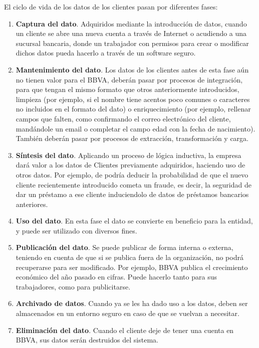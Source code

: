 \documentclass{article}
\begin{document}
El ciclo de vida de los datos de los clientes pasan por diferentes fases:

\begin{enumerate}
\item \textbf{Captura del dato}. Adquiridos mediante la introducción de datos, cuando un cliente se abre una nueva cuenta a través de Internet o acudiendo a una sucursal bancaria, donde un trabajador con permisos para crear o modificar dichos datos pueda hacerlo a través de un software seguro.
\item \textbf{Mantenimiento del dato}. Los datos de los clientes antes de esta fase aún no tienen valor para el BBVA, deberán pasar por procesos de integración, para que tengan el mismo formato que otros anteriormente introducidos, limpieza (por ejemplo, si el nombre tiene acentos poco comunes o caracteres no incluidos en el formato del dato) o enriquecimiento (por ejemplo, rellenar campos que falten, como confirmando el correo electrónico del cliente, mandándole un email o completar el campo edad con la fecha de nacimiento). También deberán pasar por procesos de extracción, transformación y carga.
\item \textbf{Síntesis del dato}. Aplicando un proceso de lógica inductiva, la empresa dará valor a los datos de Clientes previamente adquiridos, haciendo uso de otros datos. Por ejemplo, de podría deducir la probabilidad de que el nuevo cliente recientemente introducido cometa un fraude, es decir, la seguridad de dar un préstamo a ese cliente induciendolo de datos de préstamos bancarios anteriores.
\item \textbf{Uso del dato}. En esta fase el dato se convierte en beneficio para la entidad, y puede ser utilizado con diversos fines.
\item \textbf{Publicación del dato}. Se puede publicar de forma interna o externa, teniendo en cuenta de que si se publica fuera de la organización, no podrá recuperarse para ser modificado. Por ejemplo, BBVA publica el crecimiento económico del año pasado en cifras. Puede hacerlo tanto para sus trabajadores, como para publicitarse.
\item \textbf{Archivado de datos}. Cuando ya se les ha dado uso a los datos, deben ser almacenados en un entorno seguro en caso de que se vuelvan a necesitar.
\item \textbf{Eliminación del dato}. Cuando el cliente deje de tener una cuenta en BBVA, sus datos serán destruidos del sistema.

\end{enumerate}
\end{document}

